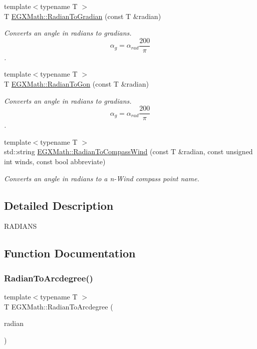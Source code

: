 \begin{DoxyCompactItemize}
{\footnotesize template$<$typename T $>$ }\\T \mbox{\hyperlink{group___e_g_x_math-_angle_conversions-_radian_ga3c1607eae50cbf0186c42485bb3878d5}{E\+G\+X\+Math\+::\+Radian\+To\+Gradian}} (const T \&radian)
\begin{DoxyCompactList}\small\item\em Converts an angle in radians to gradians. \[\alpha_{g}=\alpha_{rad}\frac{200}{\pi}\]. \end{DoxyCompactList}\item 
{\footnotesize template$<$typename T $>$ }\\T \mbox{\hyperlink{group___e_g_x_math-_angle_conversions-_radian_ga36912e5a810b64c271c4dafc17f4ca45}{E\+G\+X\+Math\+::\+Radian\+To\+Gon}} (const T \&radian)
\begin{DoxyCompactList}\small\item\em Converts an angle in radians to gradians. \[\alpha_{g}=\alpha_{rad}\frac{200}{\pi}\]. \end{DoxyCompactList}\item 
{\footnotesize template$<$typename T $>$ }\\std\+::string \mbox{\hyperlink{group___e_g_x_math-_angle_conversions-_radian_ga4d845b171148481aa7e85018d6dad035}{E\+G\+X\+Math\+::\+Radian\+To\+Compass\+Wind}} (const T \&radian, const unsigned int winds, const bool abbreviate)
\begin{DoxyCompactList}\small\item\em Converts an angle in radians to a n-\/\+Wind compass point name. \end{DoxyCompactList}\end{DoxyCompactItemize}


\subsection{Detailed Description}
R\+A\+D\+I\+A\+NS 

\subsection{Function Documentation}
\mbox{\label{group___e_g_x_math-_angle_conversions-_radian_ga3dfdc97357cc07f8379976bbc08f9852}} 
\subsubsection{\texorpdfstring{Radian\+To\+Arcdegree()}{RadianToArcdegree()}}
{\footnotesize\ttfamily template$<$typename T $>$ \\
T E\+G\+X\+Math\+::\+Radian\+To\+Arcdegree (\begin{DoxyParamCaption}\item[{const T \&}]{radian }\end{DoxyParamCaption})}



